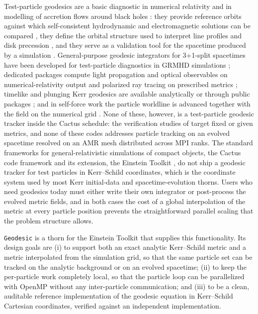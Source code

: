 \documentclass[11pt]{article}
\begin{document}
Test-particle geodesics are a basic diagnostic in numerical relativity and
in modelling of accretion flows around black holes \citep{poisson2004}:
they provide reference
orbits against which self-consistent hydrodynamic and electromagnetic
solutions can be compared \citep{bz1977}, they define the orbital structure used to
interpret line profiles and disk precession \citep{bardeen1973,gralla2020}, and they serve as a
validation tool for the spacetime produced by a simulation
\citep{kerr1963,bardeen1972,wilkins1972}.
General-purpose geodesic integrators for 3+1-split spacetimes have been
developed for test-particle diagnostics in GRMHD simulations
\citep{bacchini2018,bacchini2019}; dedicated packages compute light
propagation and optical observables on numerical-relativity output
\citep{grasso2022} and polarized ray tracing on prescribed metrics
\citep{aimar2024}; timelike and plunging Kerr geodesics are available
analytically or through public packages \citep{park2024,dyson2023}; and in
self-force work the particle worldline is advanced together with the field
on the numerical grid \citep{vretinaris2026}.  None of these, however, is a
test-particle geodesic tracker inside the Cactus schedule: the verification
studies of \citet{bacchini2018,bacchini2019} target fixed or given metrics,
and none of these codes addresses particle tracking on an evolved spacetime
resolved on an AMR mesh distributed across MPI ranks.  The standard
frameworks for
general-relativistic simulations of compact objects, the Cactus code
framework \citep{cactusweb} and its extension, the Einstein Toolkit
\citep{loeffler2012}, do not ship a geodesic tracker for test particles in
Kerr--Schild coordinates, which is the coordinate system used by most
Kerr initial-data and spacetime-evolution thorns.  Users who need geodesics
today must either write their own integrator or post-process the evolved
metric fields, and in both cases the cost of a global interpolation of the
metric at every particle position prevents the straightforward parallel
scaling that the problem structure allows.

\texttt{Geodesic} is a thorn for the Einstein Toolkit that supplies this
functionality.
Its design goals are (i) to support both an exact analytic Kerr--Schild
metric and a metric interpolated from the simulation grid, so that the same
particle set can be tracked on the analytic background or on an evolved
spacetime; (ii) to keep the per-particle work completely local, so that the
particle loop can be parallelized with OpenMP without any inter-particle
communication; and (iii) to be a clean, auditable reference implementation
of the geodesic equation in Kerr--Schild Cartesian coordinates, verified
against an independent implementation.
\end{document}
